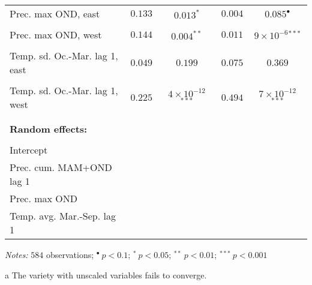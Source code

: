 \documentclass[a4paper,12pt]{article}
\begin{document}
{\begin{threeparttable}
\begin{small}
\begin{tabular}{lrccc}
      \vspace{-0.2cm}Prec. max OND, east&$0.133$&$0.013^{*}$&$0.004$&$0.085^{\bullet}$\\
  \\
        \vspace{-0.2cm}Prec. max OND, west&$0.144$&$0.004^{**}$&$0.011$&$9\times10^{-6}$$^{***}$\\
  \\
    \vspace{-0.2cm}Temp. sd. Oc.-Mar. lag 1, east&$0.049$&$0.199$&$0.075$&$0.369$\\
  \\
      \vspace{-0.2cm}Temp. sd. Oc.-Mar. lag 1, west&$0.225$& $4\times10^{-12}$ $^{***}$&$0.494$&$7\times10^{-12}$ $^{***}$\\
  \\
  \hline
\vspace{-0.3cm} \\
  \multicolumn{1}{l}{\textbf{Random effects:}}  & \\
\vspace{-0.3cm}
\\
\hline
Intercept\\
Prec. cum. MAM+OND lag 1\\
 Prec. max OND\\
Temp. avg. Mar.-Sep. lag 1
  \\
  \hline
\end{tabular} 
\end{small}
 \begin{tablenotes}
  \begin{footnotesize}
    \item \textit{Notes:} \hspace{0.15cm}$584$ observations; \hspace{0.15cm}$^{\bullet}~p<0.1$; $^{*}~p<0.05$; $^{**}~p<0.01$; $^{***}~p<0.001$
    \begin{adjustwidth}{1cm}{} 
    \item[a] The variety with unscaled variables fails to converge.
     \end{adjustwidth}
\singlespacing
  \end{footnotesize}
\end{tablenotes}
  \end{threeparttable} 
\par}
\linespread{1}

\pagebreak
\end{document}
